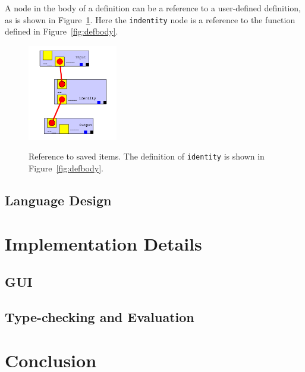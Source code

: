 \documentclass[12pt,UTF8,a4]{article}
\begin{document}
A node in the body of a definition can be a reference to a user-defined definition, as is shown in Figure~\ref{fig:ref}. Here the \texttt{indentity} node is a reference to the function defined in Figure~\ref{fig:defbody}.
\begin{figure}[h]
\center
\includegraphics[width=0.35\textwidth]{./images/ref.png} \\
\caption{Reference to saved items. The definition of \texttt{identity} is shown in Figure~\ref{fig:defbody}.}\label{fig:ref}
\end{figure}

\subsection{Language Design}
\section{Implementation Details}
\subsection{GUI}
\subsection{Type-checking and Evaluation}
\section{Conclusion}
\end{document}
